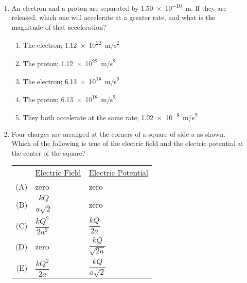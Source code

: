 \documentclass{../../../oss-classkick}
\begin{document}
\begin{multicols}{2}
\begin{enumerate}[leftmargin=18pt]
  \item An electron and a proton are separated by \SI{1.50e-10}{\metre}. If
    they are released, which one will accelerate at a greater rate, and what is
    the magnitude of that acceleration?
    \begin{enumerate}[nosep,leftmargin=18pt,label=(\Alph*)]
    \item The electron; \SI{1.12e22}{m/s^2}
    \item The proton; \SI{1.12e22}{m/s^2}
    \item The electron; \SI{6.13e18}{m/s^2}
    \item The proton; \SI{6.13e18}{m/s^2}
    \item They both accelerate at the same rate; \SI{1.02e-8}{m/s^2}
    \end{enumerate}
    \vspace{.7in}
    
  \item Four charges are arranged at the corners of a square of side a as shown.
    Which of the following is true of the electric field and the electric
    potential at the center of the square?
    \begin{center}
    \end{center}
    \begin{tabular}{rll}
      & \underline{Electric Field} & \underline{Electric Potential}\\
      (A) & zero & zero \\
      (B) & $\dfrac{kQ}{a\sqrt{2}}$ & zero \\
      (C) & $\dfrac{kQ^2}{2a^2}$ &  $\dfrac{kQ}{2a}$\\
      (D) & zero &  $\dfrac{kQ}{\sqrt{2a}}$\\
      (E) & $\dfrac{kQ^2}{2a}$ & $\dfrac{kQ}{a\sqrt{2}}$
    \end{tabular}

    \columnbreak
    

\end{enumerate}
\end{multicols}
\end{document}

